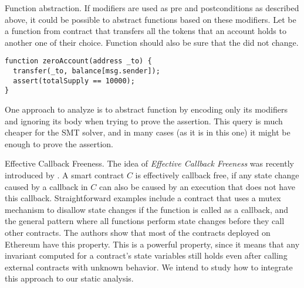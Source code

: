 \begin{paragraph}{Function abstraction.}
If modifiers are used as pre and postconditions as described above, it could be
possible to abstract functions based on these modifiers.
%
Let  be a function from contract  that transfers
all the tokens that an account holds to another one of their choice.
%
Function  should also be sure that the  did
not change.

\begin{verbatim}
function zeroAccount(address _to) {
  transfer(_to, balance[msg.sender]);
  assert(totalSupply == 10000);
}
\end{verbatim}

One approach to analyze  is to abstract function
 by encoding only its modifiers and ignoring its body when
trying to prove the assertion.
%
This query is much cheaper for the SMT solver, and in many cases (as it is in
this one) it might be enough to prove the assertion.
\end{paragraph}

\begin{paragraph}{Effective Callback Freeness.}
The idea of \emph{Effective Callback Freeness} was recently introduced by
\cite{Grossman}.
%
A smart contract $C$ is effectively callback free, if any state change caused
by a callback in $C$ can also be caused by an execution that does not have this
callback.
%
Straightforward examples include a contract that uses a mutex mechanism to
disallow state changes if the function is called as a callback, and the general
pattern where all functions perform state changes before they call other
contracts.
%
The authors show that most of the contracts deployed on Ethereum have this
property.
%
This is a powerful property, since it means that any invariant computed for a
contract's state variables still holds even after calling external contracts
with unknown behavior.
%
We intend to study how to integrate this approach to our static analysis.
\end{paragraph}

